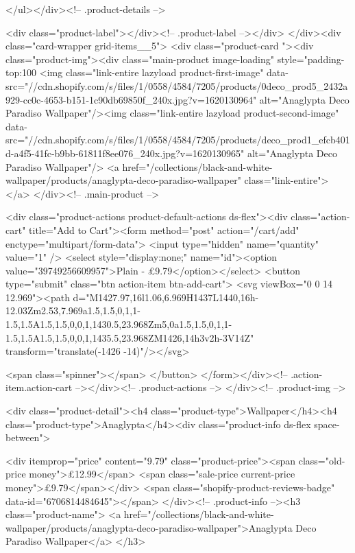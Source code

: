 {{{{{{{      </ul></div><!-- .product-details -->

<div class="product-label"></div><!-- .product-label --></div>
          </div><div class="card-wrapper grid-items__5">
            <div class="product-card "><div class="product-img"><div class="main-product image-loading" style="padding-top:100%
      <img class="link-entire lazyload product-first-image" data-src="//cdn.shopify.com/s/files/1/0558/4584/7205/products/0deco_prod5_2432a929-cc0c-4653-b151-1c90db69850f_240x.jpg?v=1620130964" alt="Anaglypta Deco Paradiso Wallpaper"/><img class="link-entire lazyload product-second-image" data-src="//cdn.shopify.com/s/files/1/0558/4584/7205/products/deco_prod1_efcb401d-a4f5-41fc-b9bb-61811f8ee076_240x.jpg?v=1620130965" alt="Anaglypta Deco Paradiso Wallpaper"/>
      <a href="/collections/black-and-white-wallpaper/products/anaglypta-deco-paradiso-wallpaper" class="link-entire"></a>
    </div><!-- .main-product -->
  
<div class="product-actions product-default-actions ds-flex"><div class="action-cart" title="Add to Cart"><form method="post" action="/cart/add" enctype="multipart/form-data">
            <input type="hidden" name="quantity" value="1" />
            <select style="display:none;" name="id"><option value="39749256609957">Plain - £9.79</option></select>
            <button type="submit" class="btn action-item btn-add-cart">
              <svg viewBox="0 0 14 12.969"><path d="M1427.97,16l1.06,6.969H1437L1440,16h-12.03Zm2.53,7.969a1.5,1.5,0,1,1-1.5,1.5A1.5,1.5,0,0,1,1430.5,23.968Zm5,0a1.5,1.5,0,1,1-1.5,1.5A1.5,1.5,0,0,1,1435.5,23.968ZM1426,14h3v2h-3V14Z" transform="translate(-1426 -14)"/></svg>

              <span class="spinner"></span>
            </button>
          </form></div><!-- .action-item.action-cart --></div><!-- .product-actions -->
</div><!-- .product-img -->

<div class="product-detail"><h4 class="product-type">Wallpaper</h4><h4 class="product-type">Anaglypta</h4><div class="product-info ds-flex space-between">
    
<div itemprop="price" content="9.79" class="product-price"><span class="old-price money">£12.99</span>
    <span class="sale-price current-price money">£9.79</span></div>
    <span class="shopify-product-reviews-badge" data-id="6706814484645"></span>
  </div><!-- .product-info --><h3 class="product-name">
      <a href="/collections/black-and-white-wallpaper/products/anaglypta-deco-paradiso-wallpaper">Anaglypta Deco Paradiso Wallpaper</a>
    </h3>
    
}}}}}}}
